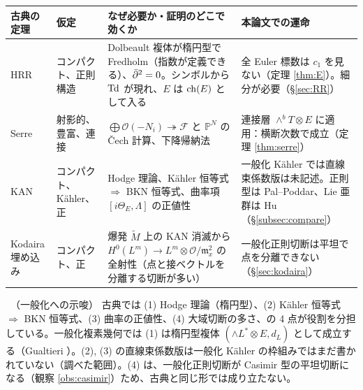 \begin{center}\small
\begin{tabular}{>{\raggedright\arraybackslash}p{2.3cm}>{\raggedright\arraybackslash}p{2.9cm}>{\raggedright\arraybackslash}p{4.4cm}>{\raggedright\arraybackslash}p{4.6cm}}
\toprule 古典の定理 & 仮定 & なぜ必要か・証明のどこで効くか & 本論文での運命\\\midrule
HRR & コンパクト、正則構造 & Dolbeault 複体が楕円型で Fredholm（指数が定義できる）、$\bar\partial^2=0$。シンボルから $\mathrm{Td}$ が現れ、$E$ は $\mathrm{ch}(E)$ として入る & 全 Euler 標数は $c_1$ を見ない（定理 \ref{thm:E}）。細分が必要（\S\ref{sec:RR}）\\\midrule
Serre & 射影的、豊富、連接 & $\bigoplus\mathcal O(-N_i)\twoheadrightarrow\mathcal F$ と $\mathbb P^N$ の \v Cech 計算、下降帰納法 & 連接層 $\wedge^bT\otimes E$ に適用：横断次数で成立（定理 \ref{thm:serre}）\\\midrule
KAN & コンパクト、Kähler、正 & Hodge 理論、Kähler 恒等式 $\Rightarrow$ BKN 恒等式、曲率項 $[i\Theta_E,\Lambda]$ の正値性 & 一般化 Kähler では直線束係数版は未記述。正則型は Pal--Poddar、Lie 亜群は Hu（\S\ref{subsec:compare}）\\\midrule
Kodaira 埋め込み & コンパクト、正 & 爆発 $\tilde M$ 上の KAN 消滅から $H^0(L^m)\to L^m\otimes\mathcal O/\mathfrak m_x^2$ の全射性（点と接ベクトルを分離する切断が多い） & 一般化正則切断は平坦で点を分離できない（\S\ref{sec:kodaira}）\\\bottomrule
\end{tabular}
\end{center}

\begin{rem}\tK\ （一般化への示唆）
古典では (1) Hodge 理論（楕円型）、(2) Kähler 恒等式 $\Rightarrow$ BKN 恒等式、(3) 曲率の正値性、(4) 大域切断の多さ、の 4 点が役割を分担している。一般化複素幾何では (1) は楕円型複体 $(\wedge L^*\otimes E,d_L)$ として成立する（Gualtieri \cite{Gua11}）。(2), (3) の直線束係数版は一般化 Kähler の枠組みではまだ書かれていない（調べた範囲）。(4) は、一般化正則切断が Casimir 型の平坦切断になる（観察 \ref{obs:casimir}）ため、古典と同じ形では成り立たない。
\end{rem}

